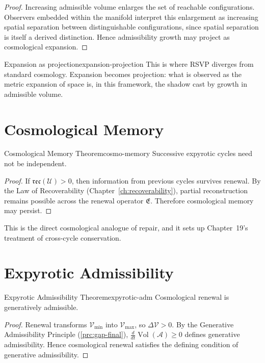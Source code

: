 \documentclass[12pt,twoside,openright]{book}
\newcommand{\reco}{\mathfrak{rec}}
\newcommand{\Vol}{\operatorname{Vol}}
\begin{document}
\begin{proof}
  Increasing admissible volume enlarges the set of
  reachable configurations. Observers embedded within the
  manifold interpret this enlargement as increasing spatial
  separation between distinguishable configurations, since
  spatial separation is itself a derived distinction.
  Hence admissibility growth may project as cosmological
  expansion.
\end{proof}

\begin{remark}{Expansion as projection}{expansion-projection}
  This is where RSVP diverges from standard cosmology.
  Expansion becomes projection: what is observed as the
  metric expansion of space is, in this framework, the
  shadow cast by growth in admissible volume.
\end{remark}

\section{Cosmological Memory}
\label{sec:ch18-memory}

\begin{theorem}{Cosmological Memory Theorem}{cosmo-memory}
  Successive expyrotic cycles need not be independent.
\end{theorem}

\begin{proof}
  If $\reco(\mathcal{U}) > 0$, then information from
  previous cycles survives renewal. By the Law of
  Recoverability (Chapter~\ref{ch:recoverability}), partial
  reconstruction remains possible across the renewal
  operator $\mathfrak{E}$. Therefore cosmological memory may
  persist.
\end{proof}

This is the direct cosmological analogue of repair, and it
sets up Chapter~19's treatment of cross-cycle conservation.

\section{Expyrotic Admissibility}
\label{sec:ch18-admissibility}

\begin{theorem}{Expyrotic Admissibility Theorem}{expyrotic-adm}
  Cosmological renewal is generatively admissible.
  \parencite{steinhardt2002,penrose2010}
\end{theorem}

\begin{proof}
  Renewal transforms $\mathcal{V}_{\min}$ into
  $\mathcal{V}_{\max}$, so $\Delta\mathcal{V} > 0$. By the
  Generative Admissibility Principle
  (\cref{prc:gap-final}), $\frac{d}{dt}\Vol(\mathcal{A}) \ge 0$
  defines generative admissibility. Hence cosmological
  renewal satisfies the defining condition of generative
  admissibility.
\end{proof}
\end{document}
